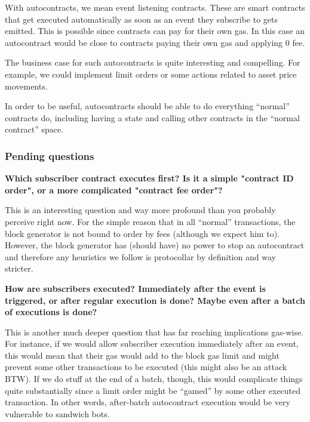 \documentclass[twocolumn, nofootinbib]{revtex4-2}
\begin{document}
    With autocontracts, we mean event listening contracts.
    These are smart contracts that get executed automatically as soon as an
    event they subscribe to gets emitted.
    This is possible since contracts can pay for their own gas.
    In this case an autocontract would be close to contracts paying their own
    gas and applying 0 fee.

    The business case for such autocontracts is quite interesting and
    compelling.
    For example, we could implement limit orders or some actions related to
    asset price movements.

    In order to be useful, autocontracts should be able to do everything
    ``normal'' contracts do, including having a state and calling other
    contracts in the ``normal contract'' space.

    \subsubsection{Pending questions}\label{subsubsec:pending-questions}
    \textbf{Which subscriber contract executes first? Is it a simple "contract
            ID order", or a more complicated "contract fee order"?}

    This is an interesting question and way more profound than you probably
    perceive right now.
    For the simple reason that in all ``normal'' transactions, the block
    generator is not bound to order by fees (although we expect him to).
    However, the block generator has (should have) no power to stop an
    autocontract and therefore any heuristics we follow is protocollar by
    definition and way stricter.

    \textbf{How are subscribers executed? Immediately after the event is
    triggered, or after regular execution is done? Maybe even after a batch of
    executions is done?}

    This is another much deeper question that has far reaching implications
    gas-wise.
    For instance, if we would allow subscriber execution immediately after an
    event, this would mean that their gas would add to the block gas limit and
    might prevent some other transactions to be executed (this might also be an
    attack BTW). If we do stuff at the end of a batch, though, this would
    complicate things quite substantially since a limit order might be
    ``gamed'' by some other executed transaction.
    In other words, after-batch autocontract execution would be very vulnerable
    to sandwich bots.
\end{document}
